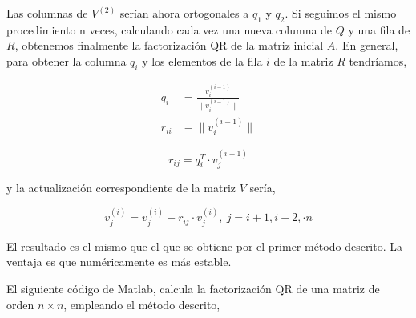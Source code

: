 Las columnas de $V^{(2)}$ serían ahora ortogonales a $q_1$ y $q_2$. Si seguimos el mismo procedimiento n veces, calculando cada vez una nueva columna de $Q$ y una fila de $R$, obtenemos finalmente la factorización QR de la matriz inicial $A$. En general, para obtener la columna $q_i$ y los elementos de la fila $i$ de la matriz $R$ tendríamos,
 
\begin{align*}
q_i&=\frac{v_i^{(i-1)}}{\lVert v_i^{(i-1)} \rVert}\\
r_{ii}&=\lVert v_i^{(i-1)} \rVert
\end{align*}

\begin{equation*}
r_{ij}=q_i^T\cdot v_j^{(i-1)}
\end{equation*}

y la actualización correspondiente de la matriz $V$ sería,

\begin{equation*}
v_j^{(i)}=v_j^{(i)}-r_{ij}\cdot v_j^{(i)}, \ j=i+1,i+2,\cdot n
\end{equation*}

El resultado es el mismo que el que se obtiene por el primer método descrito. La ventaja es que numéricamente es más estable. 



El siguiente código de Matlab, calcula la factorización QR de una matriz de orden $n\times n$, empleando el método descrito,

